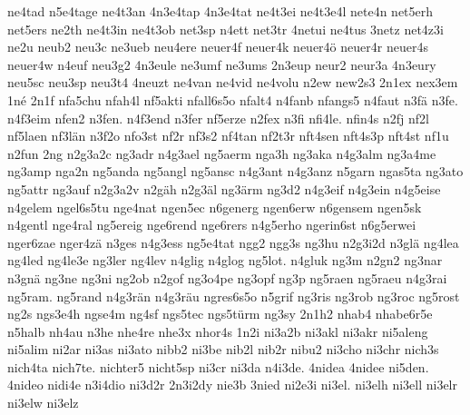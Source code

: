 {    ne4tad
    n5e4tage
    ne4t3an
    4n3e4tap
    4n3e4tat
    ne4t3ei
    ne4t3e4l
    nete4n
    net5erh
    net5ers
    ne2th
    ne4t3in
    ne4t3ob
    net3sp
    n4ett
    net3tr
    4netui
    ne4tus
    3netz
    net4z3i
    ne2u
    neub2
    neu3c
    ne3ueb
    neu4ere
    neuer4f
    neuer4k
    neuer4ö
    neuer4r
    neuer4s
    neuer4w
    n4euf
    neu3g2
    4n3eule
    ne3umf
    ne3ums
    2n3eup
    neur2
    neur3a
    4n3eury
    neu5sc
    neu3sp
    neu3t4
    4neuzt
    ne4van
    ne4vid
    ne4volu
    n2ew
    new2s3
    2n1ex
    nex3em
    1né
    2n1f
    nfa5chu
    nfah4l
    nf5akti
    nfall6s5o
    nfalt4
    n4fanb
    nfangs5
    n4faut
    n3fä
    n3fe.
    n4f3eim
    nfen2
    n3fen.
    n4f3end
    n3fer
    nf5erze
    n2fex
    n3fi
    nfi4le.
    nfin4s
    n2fj
    nf2l
    nf5laen
    nf3län
    n3f2o
    nfo3st
    nf2r
    nf3s2
    nf4tan
    nf2t3r
    nft4sen
    nft4s3p
    nft4st
    nf1u
    n2fun
    2ng
    n2g3a2c
    ng3adr
    n4g3ael
    ng5aerm
    nga3h
    ng3aka
    n4g3alm
    ng3a4me
    ng3amp
    nga2n
    ng5anda
    ng5angl
    ng5ansc
    n4g3ant
    n4g3anz
    n5garn
    ngas5ta
    ng3ato
    ng5attr
    ng3auf
    n2g3a2v
    n2gäh
    n2g3äl
    ng3ärm
    ng3d2
    n4g3eif
    n4g3ein
    n4g5eise
    n4gelem
    ngel6s5tu
    nge4nat
    ngen5ec
    n6generg
    ngen6erw
    n6gensem
    ngen5sk
    n4gentl
    nge4ral
    ng5ereig
    nge6rend
    nge6rers
    n4g5erho
    ngerin6st
    n6g5erwei
    nger6zae
    nger4zä
    n3ges
    n4g3ess
    ng5e4tat
    ngg2
    ngg3s
    ng3hu
    n2g3i2d
    n3glä
    ng4lea
    ng4led
    ng4le3e
    ng3ler
    ng4lev
    n4glig
    n4glog
    ng5lot.
    n4gluk
    ng3m
    n2gn2
    ng3nar
    n3gnä
    ng3ne
    ng3ni
    ng2ob
    n2gof
    ng3o4pe
    ng3opf
    ng3p
    ng5raen
    ng5raeu
    n4g3rai
    ng5ram.
    ng5rand
    n4g3rän
    n4g3räu
    ngres6s5o
    n5grif
    ng3ris
    ng3rob
    ng3roc
    ng5rost
    ng2s
    ngs3e4h
    ngse4m
    ng4sf
    ngs5tec
    ngs5türm
    ng3sy
    2n1h2
    nhab4
    nhabe6r5e
    n5halb
    nh4au
    n3he
    nhe4re
    nhe3x
    nhor4s
    1n2i
    ni3a2b
    ni3akl
    ni3akr
    ni5aleng
    ni5alim
    ni2ar
    ni3as
    ni3ato
    nibb2
    ni3be
    nib2l
    nib2r
    nibu2
    ni3cho
    ni3chr
    nich3s
    nich4ta
    nich7te.
    nichter5
    nicht5sp
    ni3cr
    ni3da
    n4i3de.
    4nidea
    4nidee
    ni5den.
    4nideo
    nidi4e
    n3i4dio
    ni3d2r
    2n3i2dy
    nie3b
    3nied
    ni2e3i
    ni3el.
    ni3elh
    ni3ell
    ni3elr
    ni3elw
    ni3elz
}
